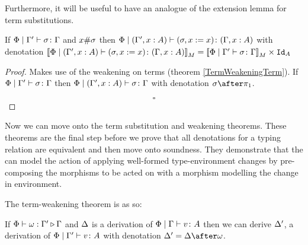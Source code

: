 \documentclass{Report}
\begin{document}
Furthermore, it will be useful to have an analogue of the extension lemma for term substitutions.


\begin{lemma}
    If $\Phi\mid\Gamma' \vdash \sigma \colon \Gamma$ and $x\#\sigma$ then $\Phi\mid(\Gamma',x: A) \vdash (\sigma, x:= x) \colon (\Gamma, x: A)$ with denotation ${\bf [\![}\Phi\mid(\Gamma',x: A) \vdash (\sigma, x:= x) \colon (\Gamma, x: A){\bf ]\!]}_M = {\bf [\![}\Phi\mid\Gamma' \vdash \sigma \colon \Gamma{\bf ]\!]}_M \times \texttt{Id}_{A}$
\end{lemma}

\begin{proof}
     Makes use of the weakening on terms (theorem \ref{TermWeakeningTerm}). If $\Phi\mid\Gamma' \vdash \sigma \colon \Gamma$ then $\Phi\mid(\Gamma', x:A)  \vdash \sigma \colon \Gamma$ with denotation $\si\after\p$.

     $$\square$$
\end{proof}


Now we can move onto the term substitution and weakening theorems. These theorems are the final step before we prove that all denotations for a typing relation are equivalent and then move onto soundness. They demonstrate that the can model the action of applying well-formed type-environment changes by pre-composing the morphisms to be acted on with a morphism modelling the change in environment.

The term-weakening theorem is as so: 

\begin{theorem}\label{TermWeakeningTerm}
    If $\Phi\vdash \omega : \Gamma' \triangleright \Gamma$ and $\Delta$ is a derivation of $\Phi\mid\Gamma \vdash v \colon A$ then we can derive $\Delta'$, a derivation of $\Phi\mid\Gamma' \vdash v \colon A$ with denotation $\D' = \D\after\w$.
\end{theorem}
\end{document}
